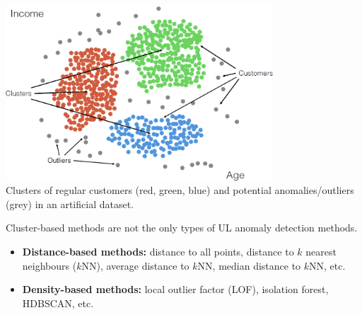 \documentclass[20pt,landscape,footrule,headrule]{foils}
\def\fh{\foilhead}
\begin{document}
\newpage\  
\begin{center}
\includegraphics[width=0.75\textwidth]{Images/clustering2_EN.png} \\ 
Clusters of regular customers (red, green, blue) and potential anomalies/outliers (grey) in an artificial dataset.
\end{center}



\fh{\textcolor{darkestgreen}{6.2 -- Quantitative Methods of Anomaly Detection}} \label{6.2} 

\noindent Cluster-based methods are not the only types of UL anomaly detection methods.
\begin{itemize}
\item \textbf{Distance-based methods:} distance to all points, distance to $k$ nearest neighbours ($k$NN),  average distance to $k$NN, median distance to $k$NN, etc.
\item \textbf{Density-based methods:} local outlier factor (LOF), isolation forest, HDBSCAN, etc.
\end{itemize}
\end{document}
